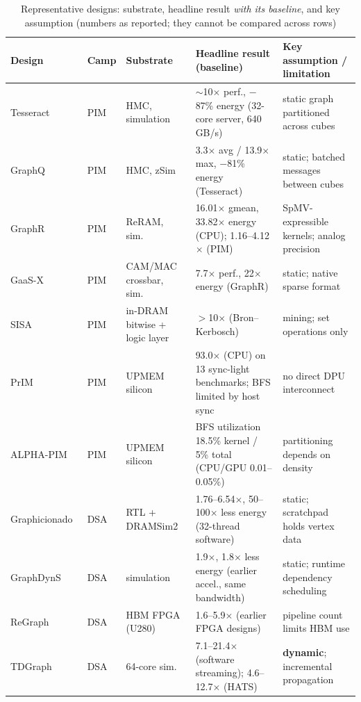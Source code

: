 \documentclass[journal,onecolumn]{IEEEtran}
\begin{document}
\begin{table}[t]
\caption{Representative designs: substrate, headline result \emph{with its baseline}, and key assumption (numbers as reported; they cannot be compared across rows)}
\label{tab:designs}
\centering\footnotesize
\begin{tabularx}{\textwidth}{@{}L{2.3cm}L{1.1cm}L{3.0cm}YL{4.0cm}@{}}
\toprule
Design & Camp & Substrate & Headline result (baseline) & Key assumption / limitation \\
\midrule
Tesseract~\cite{ahn2015tesseract} & PIM & HMC, simulation & $\sim$10$\times$ perf., $-$87\% energy (32-core server, 640\,GB/s) & static graph partitioned across cubes \\
GraphQ~\cite{zhuo2019graphq} & PIM & HMC, zSim & 3.3$\times$ avg / 13.9$\times$ max, $-$81\% energy (Tesseract) & static; batched messages between cubes \\
GraphR~\cite{song2018graphr} & PIM & ReRAM, sim.\ & 16.01$\times$ gmean, 33.82$\times$ energy (CPU); 1.16--4.12$\times$ (PIM) & SpMV-expressible kernels; analog precision \\
GaaS-X~\cite{challapalle2020gaasx} & PIM & CAM/MAC crossbar, sim.\ & 7.7$\times$ perf., 22$\times$ energy (GraphR) & static; native sparse format \\
SISA~\cite{besta2021sisa} & PIM & in-DRAM bitwise + logic layer & $>$10$\times$ (Bron--Kerbosch) & mining; set operations only \\
PrIM~\cite{gomezluna2022prim} & PIM & UPMEM silicon & 93.0$\times$ (CPU) on 13 sync-light benchmarks; BFS limited by host sync & no direct DPU interconnect \\
ALPHA-PIM~\cite{barkhordar2025alphapim} & PIM & UPMEM silicon & BFS utilization 18.5\% kernel / 5\% total (CPU/GPU 0.01--0.05\%) & partitioning depends on density \\
Graphicionado~\cite{ham2016graphicionado} & DSA & RTL + DRAMSim2 & 1.76--6.54$\times$, 50--100$\times$ less energy (32-thread software) & static; scratchpad holds vertex data \\
GraphDynS~\cite{yan2019graphdyns} & DSA & simulation & 1.9$\times$, 1.8$\times$ less energy (earlier accel., same bandwidth) & static; runtime dependency scheduling \\
ReGraph~\cite{chen2022regraph} & DSA & HBM FPGA (U280) & 1.6--5.9$\times$ (earlier FPGA designs) & pipeline count limits HBM use \\
TDGraph~\cite{zhao2022tdgraph} & DSA & 64-core sim.\ & 7.1--21.4$\times$ (software streaming); 4.6--12.7$\times$ (HATS) & \textbf{dynamic}; incremental propagation \\

\end{tabularx}
\end{table}
\end{document}
